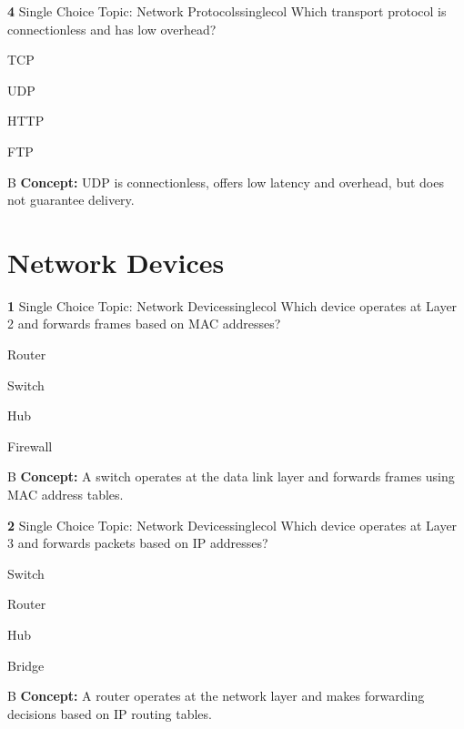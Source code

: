 \documentclass[10pt,a4paper]{article}
\begin{document}
\begin{qcard}{\color{white}\textbf{4} \hfill \small Single Choice \textbar{} Topic: Network Protocols}{singlecol}
Which transport protocol is connectionless and has low overhead?

\begin{qoptions}
\item TCP
\item UDP
\item HTTP
\item FTP
\end{qoptions}
\begin{explainbox}{B}
\textbf{Concept:} UDP is connectionless, offers low latency and overhead, but does not guarantee delivery.
\end{explainbox}
\end{qcard}

\section{Network Devices}
\begin{qcard}{\color{white}\textbf{1} \hfill \small Single Choice \textbar{} Topic: Network Devices}{singlecol}
Which device operates at Layer 2 and forwards frames based on MAC addresses?

\begin{qoptions}
\item Router
\item Switch
\item Hub
\item Firewall
\end{qoptions}
\begin{explainbox}{B}
\textbf{Concept:} A switch operates at the data link layer and forwards frames using MAC address tables.
\end{explainbox}
\end{qcard}

\begin{qcard}{\color{white}\textbf{2} \hfill \small Single Choice \textbar{} Topic: Network Devices}{singlecol}
Which device operates at Layer 3 and forwards packets based on IP addresses?

\begin{qoptions}
\item Switch
\item Router
\item Hub
\item Bridge
\end{qoptions}
\begin{explainbox}{B}
\textbf{Concept:} A router operates at the network layer and makes forwarding decisions based on IP routing tables.
\end{explainbox}
\end{qcard}
\end{document}
